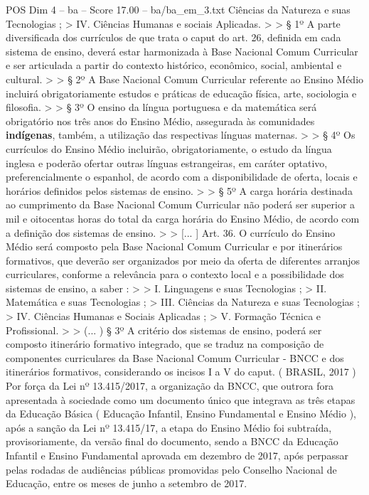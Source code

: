 \begin{textsample}{POS Dim 4 – ba – Score 17.00 – ba/ba\_em\_3.txt}
Ciências da Natureza e suas Tecnologias ; > IV.
Ciências Humanas e sociais Aplicadas. > > § 1º A parte diversificada dos currículos de que trata o caput do art. 26, definida em cada sistema de ensino, deverá estar harmonizada à Base Nacional Comum Curricular e ser articulada a partir do contexto histórico, econômico, social, ambiental e cultural. > > § 2º A Base Nacional Comum Curricular referente ao Ensino Médio incluirá obrigatoriamente estudos e práticas de educação física, arte, sociologia e filosofia. > > § 3º O ensino da língua portuguesa e da matemática será obrigatório nos três anos do Ensino Médio, assegurada às comunidades \textbf{indígenas}, também, a utilização das respectivas línguas maternas. > > § 4º Os currículos do Ensino Médio incluirão, obrigatoriamente, o estudo da língua inglesa e poderão ofertar outras línguas estrangeiras, em caráter optativo, preferencialmente o espanhol, de acordo com a disponibilidade de oferta, locais e horários definidos pelos sistemas de ensino. > > § 5º A carga horária destinada ao cumprimento da Base Nacional Comum Curricular não poderá ser superior a mil e oitocentas horas do total da carga horária do Ensino Médio, de acordo com a definição dos sistemas de ensino. > > [... ] Art. 36.
O currículo do Ensino Médio será composto pela Base Nacional Comum Curricular e por itinerários formativos, que deverão ser organizados por meio da oferta de diferentes arranjos curriculares, conforme a relevância para o contexto local e a possibilidade dos sistemas de ensino, a saber : > > I.
Linguagens e suas Tecnologias ; > II.
Matemática e suas Tecnologias ; > III.
Ciências da Natureza e suas Tecnologias ; > IV.
Ciências Humanas e Sociais Aplicadas ; > V.
Formação Técnica e Profissional. > > (... ) § 3º A critério dos sistemas de ensino, poderá ser composto itinerário formativo integrado, que se traduz na composição de componentes curriculares da Base Nacional Comum Curricular - BNCC e dos itinerários formativos, considerando os incisos I a V do caput. ( BRASIL, 2017 ) Por força da Lei nº 13.415/2017, a organização da BNCC, que outrora fora apresentada à sociedade como um documento único que integrava as três etapas da Educação Básica ( Educação Infantil, Ensino Fundamental e Ensino Médio ), após a sanção da Lei nº 13.415/17, a etapa do Ensino Médio foi subtraída, provisoriamente, da versão final do documento, sendo a BNCC da Educação Infantil e Ensino Fundamental aprovada em dezembro de 2017, após perpassar pelas rodadas de audiências públicas promovidas pelo Conselho Nacional de Educação, entre os meses de junho a setembro de 2017.

\end{textsample}
